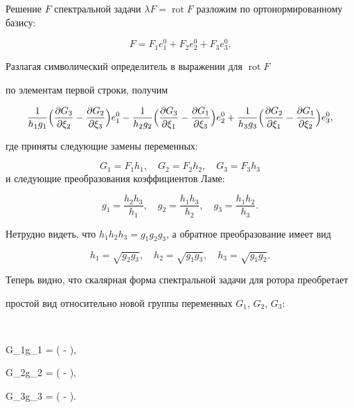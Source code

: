 Решение $F$ спектральной задачи $\lambda F = \mathop{\mathrm{rot}} F$ разложим по ортонормированному базису:

$$

F = F_1e_1^0 + F_2e_2^0 + F_3e_3^0.

$$ 

Разлагая символический определитель в выражении для $\mathop{\mathrm{rot}} F$

по элементам первой строки, получим 

$$

\frac{1}{h_1g_1}\Bigl(\frac{\partial G_3}{\partial\xi_2} - \frac{\partial G_2}{\partial\xi_3}\Bigr)e_1^0 -

\frac{1}{h_2g_2}\Bigl(\frac{\partial G_3}{\partial\xi_1} - \frac{\partial G_1}{\partial\xi_3}\Bigr)e_2^0 +

\frac{1}{h_3g_3}\Bigl(\frac{\partial G_2}{\partial\xi_1} - \frac{\partial G_1}{\partial\xi_2}\Bigr)e_3^0, 

$$ 

где приняты следующие замены переменных: 

$$G_1 = F_1h_1, \quad  G_2 = F_2h_2, \quad  G_3 =  F_3h_3$$ и следующие преобразования коэффициентов Ламе:

$$

g_1 = \frac{h_2h_3}{h_1},\quad g_2 = \frac{h_1h_3}{h_2},\quad g_3 = \frac{h_1h_2}{h_3}.

$$

Нетрудно видеть, что $h_1h_2h_3 = g_1g_2g_3$, а обратное преобразование имеет вид

$$

h_1 =\sqrt{g_2g_3},\quad h_2 =\sqrt{g_1g_3},\quad h_3 =\sqrt{g_1g_2}.

$$



Теперь видно, что скалярная форма спектральной задачи для ротора преобретает

простой вид относительно новой группы переменных $G_1$, $G_2$, $G_3$:

$$

\lambda G_1g_1 = \Bigl( - \Bigr),

\quad 

\lambda G_2g_2 = \Bigl( - \Bigr),

\quad 

\lambda G_3g_3 = \Bigl( - \Bigr).

